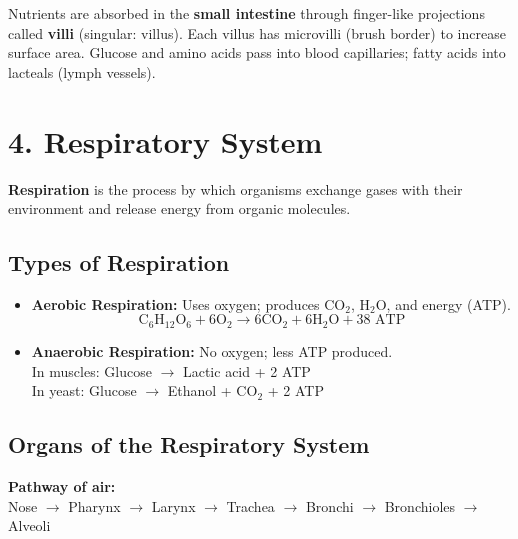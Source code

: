 \documentclass[12pt]{article}
\begin{document}
\begin{thmbox}[Absorption]
Nutrients are absorbed in the \textbf{small intestine} through finger-like projections called \textbf{villi} (singular: villus). Each villus has microvilli (brush border) to increase surface area. Glucose and amino acids pass into blood capillaries; fatty acids into lacteals (lymph vessels).
\end{thmbox}

\section{4. Respiratory System}

\begin{defbox}[Respiration]
\textbf{Respiration} is the process by which organisms exchange gases with their environment and release energy from organic molecules.
\end{defbox}

\subsection{Types of Respiration}
\begin{itemize}[leftmargin=16pt, itemsep=3pt]
  \item \textbf{Aerobic Respiration:} Uses oxygen; produces CO$_2$, H$_2$O, and energy (ATP).
  \[
    \text{C}_6\text{H}_{12}\text{O}_6 + 6\text{O}_2 \longrightarrow 6\text{CO}_2 + 6\text{H}_2\text{O} + \text{38 ATP}
  \]
  \item \textbf{Anaerobic Respiration:} No oxygen; less ATP produced.\\
  In muscles: Glucose $\to$ Lactic acid + 2 ATP\\
  In yeast: Glucose $\to$ Ethanol + CO$_2$ + 2 ATP
\end{itemize}

\subsection{Organs of the Respiratory System}
\begin{keybox}
\textbf{Pathway of air:}\\
Nose $\to$ Pharynx $\to$ Larynx $\to$ Trachea $\to$ Bronchi $\to$ Bronchioles $\to$ Alveoli
\end{keybox}
\end{document}
